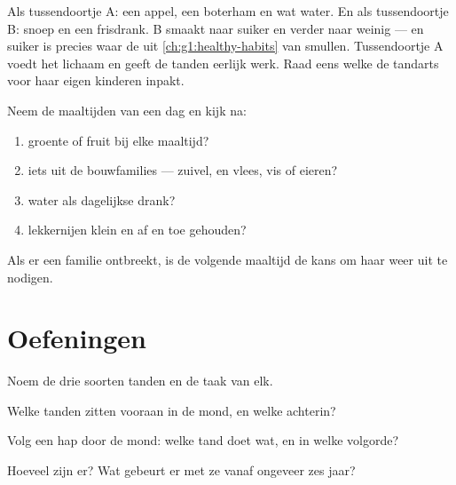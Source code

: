 \begin{example}\label{ex:g2:teeth-and-eating-well:snack}
Als tussendoortje A: een appel, een boterham en wat water. En als
tussendoortje B: snoep en een frisdrank. B smaakt naar suiker en verder
naar weinig --- en suiker is precies waar de  uit
\cref{ch:g1:healthy-habits} van smullen. Tussendoortje A voedt het
lichaam en geeft de tanden eerlijk werk. Raad eens welke de tandarts
voor haar eigen kinderen inpakt.
\end{example}

\begin{method}\label{met:g2:teeth-and-eating-well:check}
Neem de maaltijden van een dag en kijk na:
\begin{enumerate}
  \item groente of fruit bij elke maaltijd?
  \item iets uit de bouwfamilies --- zuivel, en vlees, vis of eieren?
  \item water als dagelijkse drank?
  \item lekkernijen klein en af en toe gehouden?
\end{enumerate}
Als er een familie ontbreekt, is de volgende maaltijd de kans om haar
weer uit te nodigen.
\end{method}

\section{Oefeningen}

\begin{exercise}[$\star$]\label{exo:g2:teeth-and-eating-well:1}
Noem de drie soorten tanden en de taak van elk.
\end{exercise}

\begin{exercise}[$\star$]\label{exo:g2:teeth-and-eating-well:2}
Welke tanden zitten vooraan in de mond, en welke achterin?
\end{exercise}

\begin{exercise}[$\star$]\label{exo:g2:teeth-and-eating-well:3}
Volg een hap  door de mond: welke tand doet wat, en in welke volgorde?
\end{exercise}

\begin{exercise}[$\star$]\label{exo:g2:teeth-and-eating-well:4}
Hoeveel  zijn er? Wat gebeurt er met ze vanaf ongeveer zes jaar?
\end{exercise}

